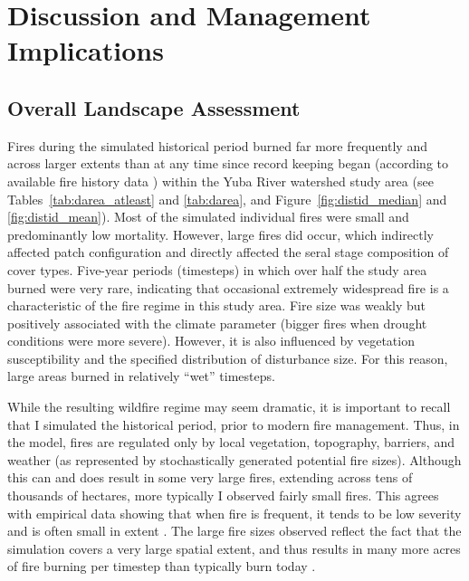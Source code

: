 
\section{Discussion and Management Implications}
\label{sec:hrvdiscussion}






\subsection{Overall Landscape Assessment}

Fires during the simulated historical period burned far more frequently and across larger extents than at any time since record keeping began (according to available fire history data \citep{calfire2012,usgs-fire-data2012}) within the Yuba River watershed study area (see Tables~\ref{tab:darea_atleast} and \ref{tab:darea}, and Figure~\ref{fig:distid_median} and \ref{fig:distid_mean}). Most of the simulated individual fires were small and predominantly low mortality. However, large fires did occur, which indirectly affected patch configuration and directly affected the seral stage composition of cover types. Five-year periods (timesteps) in which over half the study area burned were very rare, indicating that occasional extremely widespread fire is a characteristic of the fire regime in this study area. Fire size was weakly but positively associated with the climate parameter (bigger fires when drought conditions were more severe). However, it is also influenced by vegetation susceptibility and the specified distribution of disturbance size. For this reason, large areas burned in relatively ``wet'' timesteps. 

While the resulting wildfire regime may seem dramatic, it is important to recall that I simulated the historical period, prior to modern fire management. Thus, in the model, fires are regulated only by local vegetation, topography, barriers, and weather (as represented by stochastically generated potential fire sizes). Although this can and does result in some very large fires, extending across tens of thousands of hectares, more typically I observed fairly small fires. This agrees with empirical data showing that when fire is frequent, it tends to be low severity and is often small in extent \citep{Kilgore1979,Taylor2012}. The large fire sizes observed reflect the fact that the simulation covers a very large spatial extent, and thus results in many more acres of fire burning per timestep than typically burn today \citep{calfire2012,usgs-fire-data2012}.


